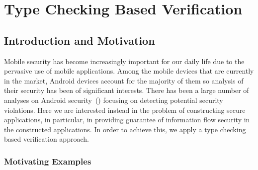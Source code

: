 
\chapter{Type Checking Based Verification} \label{ch:sta}

\section{Introduction and Motivation}\label{sec:sta_intro}

Mobile security has become increasingly important for our daily life due to the pervasive use of mobile applications.
Among the mobile devices that are currently in the market, Android devices account for the majority of them so analysis of their security
has been of significant interests. There has been a large number of analyses on Android security~(\cite{Enck:2009:UAS:1512148.1512324, Fuchs2010, Arzt:2014:FPC:2666356.2594299, Wei:2014:APG:2660267.2660357, Li:2015:IDI:2818754.2818791}) focusing on detecting potential security violations. Here we are interested instead in the problem of constructing secure applications,
in particular, in providing guarantee of information flow security in the constructed applications. In order to achieve this, we apply a type checking based verification approach.

\subsection{Motivating Examples}


